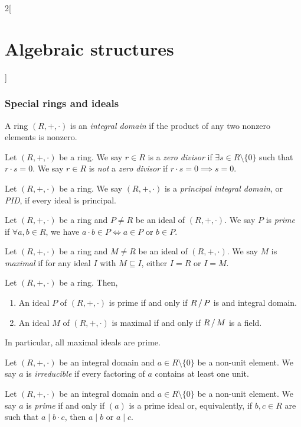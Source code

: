 \documentclass[../../../main.tex]{subfiles}
\begin{document}
\begin{multicols}{2}[\section{Algebraic structures}]
\subsubsection*{Special rings and ideals}
\begin{definition}
    A ring $(R,+,\cdot)$ is an \textit{integral domain} if the product of any two nonzero elements is nonzero.
\end{definition}
\begin{definition}
    Let $(R,+,\cdot)$ be a ring. We say $r\in R$ is a \textit{zero divisor} if $\exists s\in R\setminus\{0\}$ such that $r\cdot s=0$. We say $r\in R$ is \textit{not} a \textit{zero divisor} if $r\cdot s=0\implies s=0$. 
\end{definition}
\begin{definition}
    Let $(R,+,\cdot)$ be a ring. We say $(R,+,\cdot)$ is a \textit{principal integral domain}, or \textit{PID}, if every ideal is principal.
\end{definition}
\begin{definition}
    Let $(R,+,\cdot)$ be a ring and $P\ne R$ be an ideal of $(R,+,\cdot)$. We say $P$ is \textit{prime} if $\forall a,b\in R$, we have $a\cdot b\in P\iff a\in P\text{ or }b\in P$.
\end{definition}
\begin{definition}
    Let $(R,+,\cdot)$ be a ring and $M\ne R$ be an ideal of $(R,+,\cdot)$. We say $M$ is \textit{maximal} if for any ideal $I$ with $M\subseteq I$, either $I=R$ or $I=M$.
\end{definition}
\begin{prop}
    Let $(R,+,\cdot)$ be a ring. Then,
    \begin{enumerate}
        \item An ideal $P$ of $(R,+,\cdot)$ is prime if and only if $\quot{R}{P}$ is and integral domain.
        \item An ideal $M$ of $(R,+,\cdot)$ is maximal if and only if $\quot{R}{M}$ is a field.
    \end{enumerate}
    In particular, all maximal ideals are prime.
\end{prop}
\begin{definition}
    Let $(R,+,\cdot)$ be an integral domain and $a\in R\setminus\{0\}$ be a non-unit element. We say $a$ is \textit{irreducible} if every factoring of $a$ contains at least one unit. 
\end{definition}
\begin{definition}
    Let $(R,+,\cdot)$ be an integral domain and $a\in R\setminus\{0\}$ be a non-unit element. We say $a$ is \textit{prime} if and only if $(a)$ is a prime ideal or, equivalently, if $b,c\in R$ are such that $a\mid b\cdot c$, then $a\mid b$ or $a\mid c$. 

\end{definition}
\end{multicols}
\end{document}
